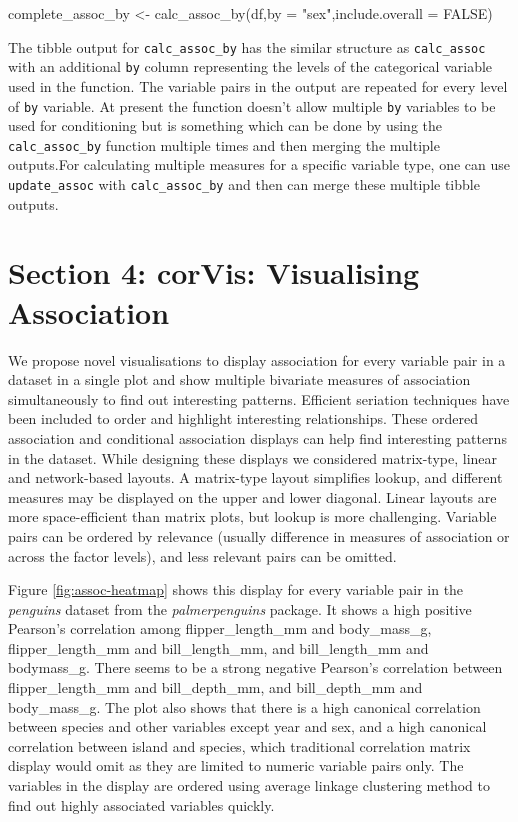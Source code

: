\begin{Schunk}
\begin{Sinput}
complete_assoc_by <- calc_assoc_by(df,by = "sex",include.overall = FALSE)
\end{Sinput}
\end{Schunk}

The tibble output for \texttt{calc\_assoc\_by} has the similar structure
as \texttt{calc\_assoc} with an additional \texttt{by} column
representing the levels of the categorical variable used in the
function. The variable pairs in the output are repeated for every level
of \texttt{by} variable. At present the function doesn't allow multiple
\texttt{by} variables to be used for conditioning but is something which
can be done by using the \texttt{calc\_assoc\_by} function multiple
times and then merging the multiple outputs.For calculating multiple
measures for a specific variable type, one can use
\texttt{update\_assoc} with \texttt{calc\_assoc\_by} and then can merge
these multiple tibble outputs.

\hypertarget{section-4-corvis-visualising-association}{%
\section{Section 4: corVis: Visualising
Association}\label{section-4-corvis-visualising-association}}

We propose novel visualisations to display association for every
variable pair in a dataset in a single plot and show multiple bivariate
measures of association simultaneously to find out interesting patterns.
Efficient seriation techniques have been included to order and highlight
interesting relationships. These ordered association and conditional
association displays can help find interesting patterns in the dataset.
While designing these displays we considered matrix-type, linear and
network-based layouts. A matrix-type layout simplifies lookup, and
different measures may be displayed on the upper and lower diagonal.
Linear layouts are more space-efficient than matrix plots, but lookup is
more challenging. Variable pairs can be ordered by relevance (usually
difference in measures of association or across the factor levels), and
less relevant pairs can be omitted.

Figure \ref{fig:assoc-heatmap} shows this display for every variable
pair in the \emph{penguins} dataset from the \emph{palmerpenguins}
package. It shows a high positive Pearson's correlation among
flipper\_length\_mm and body\_mass\_g, flipper\_length\_mm and
bill\_length\_mm, and bill\_length\_mm and bodymass\_g. There seems to
be a strong negative Pearson's correlation between flipper\_length\_mm
and bill\_depth\_mm, and bill\_depth\_mm and body\_mass\_g. The plot
also shows that there is a high canonical correlation between species
and other variables except year and sex, and a high canonical
correlation between island and species, which traditional correlation
matrix display would omit as they are limited to numeric variable pairs
only. The variables in the display are ordered using average linkage
clustering method to find out highly associated variables quickly.

